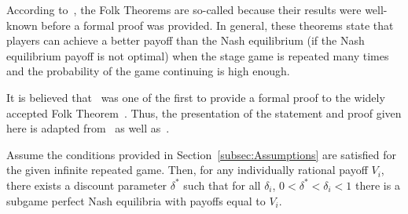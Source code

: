 According to~\cite{Webb2007}, the Folk Theorems are
so-called because their results were well-known before a formal proof was
provided. In general, these theorems state that players can achieve a better
payoff than the Nash equilibrium (if the Nash equilibrium payoff is not optimal)
when the stage game is repeated many times and the probability of the game
continuing is high enough. 

It is believed that~\cite{friedman1971non} was one of the
first to provide a formal proof to the widely accepted Folk
Theorem~\cite{Abreu1994, Webb2007}. Thus, the presentation of the statement and
proof given here is adapted from~\cite{friedman1971non} as well as~\cite{Knight2017b}.

\begin{theorem}
    Assume the conditions provided in Section~\ref{subsec:Assumptions} are
    satisfied for the given infinite repeated game. Then, for any individually
    rational payoff \(V_{i}\), there exists a discount parameter \(\delta^{*}\)
    such that for all \(\delta_{i}\), \(0 < \delta^{*} < \delta_{i} < 1\) there
    is a subgame perfect Nash equilibria with payoffs equal to \(V_{i}\).
\end{theorem}\label{thm:Folk}

